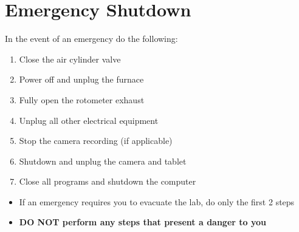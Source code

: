 \hypertarget{emergency-shutdown}{%
\section{Emergency Shutdown}\label{emergency-shutdown}}

In the event of an emergency do the following:

\begin{enumerate}
\def\labelenumi{\arabic{enumi}.}
\tightlist
\item
  Close the air cylinder valve
\item
  Power off and unplug the furnace
\item
  Fully open the rotometer exhaust
\item
  Unplug all other electrical equipment
\item
  Stop the camera recording (if applicable)
\item
  Shutdown and unplug the camera and tablet
\item
  Close all programs and shutdown the computer
\end{enumerate}

\begin{itemize}
\tightlist
\item
  If an emergency requires you to evacuate the lab, do only the first 2
  steps
\item
  \textbf{DO NOT perform any steps that present a danger to you}
\end{itemize}
